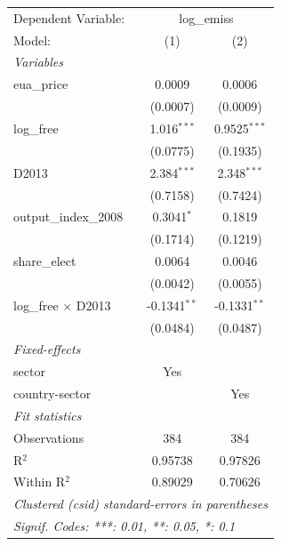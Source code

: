 
\begingroup
\centering
\begin{tabular}{lcc}
   \tabularnewline \midrule \midrule
   Dependent Variable: & \multicolumn{2}{c}{log\_emiss}\\
   Model:                     & (1)            & (2)\\  
   \midrule
   \emph{Variables}\\
   eua\_price                 & 0.0009         & 0.0006\\   
                              & (0.0007)       & (0.0009)\\   
   log\_free                  & 1.016$^{***}$  & 0.9525$^{***}$\\   
                              & (0.0775)       & (0.1935)\\   
   D2013                      & 2.384$^{***}$  & 2.348$^{***}$\\   
                              & (0.7158)       & (0.7424)\\   
   output\_index\_2008        & 0.3041$^{*}$   & 0.1819\\   
                              & (0.1714)       & (0.1219)\\   
   share\_elect               & 0.0064         & 0.0046\\   
                              & (0.0042)       & (0.0055)\\   
   log\_free $\times$ D2013   & -0.1341$^{**}$ & -0.1331$^{**}$\\   
                              & (0.0484)       & (0.0487)\\   
   \midrule
   \emph{Fixed-effects}\\
   sector                     & Yes            & \\  
   country-sector             &                & Yes\\  
   \midrule
   \emph{Fit statistics}\\
   Observations               & 384            & 384\\  
   R$^2$                      & 0.95738        & 0.97826\\  
   Within R$^2$               & 0.89029        & 0.70626\\  
   \midrule \midrule
   \multicolumn{3}{l}{\emph{Clustered (csid) standard-errors in parentheses}}\\
   \multicolumn{3}{l}{\emph{Signif. Codes: ***: 0.01, **: 0.05, *: 0.1}}\\
\end{tabular}
\par\endgroup


